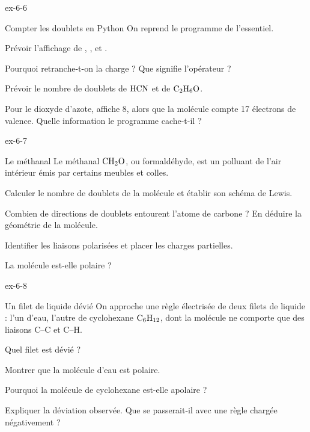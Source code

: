 \begin{blocLivre}{ex-6-6}
\begin{exercice}[2]{Compter les doublets en Python}
On reprend le programme de l'essentiel.
\begin{questions}
\item {}Prévoir l'affichage de , ,
 et .
\item Pourquoi retranche-t-on la charge ? Que signifie l'opérateur \code{//} ?
\item Prévoir le nombre de doublets de $\ce{HCN}$ et de $\ce{C2H6O}$.
\item Pour le dioxyde d'azote,  affiche 8, alors que la molécule compte 17 électrons de valence.
Quelle information le programme cache-t-il ?
\end{questions}
\end{exercice}
\end{blocLivre}
\begin{blocLivre}{ex-6-7}
\begin{exercice}[2]{Le méthanal}
Le méthanal $\ce{CH2O}$, ou formaldéhyde, est un polluant de l'air intérieur émis par certains meubles et colles.
\begin{questions}
\item Calculer le nombre de doublets de la molécule et établir son schéma de Lewis.
\item Combien de directions de doublets entourent l'atome de carbone ? En déduire la géométrie de la molécule.
\item Identifier les liaisons polarisées et placer les charges partielles.
\item La molécule est-elle polaire ?
\end{questions}
\end{exercice}
\end{blocLivre}
\begin{blocLivre}{ex-6-8}
\begin{exercice}[2]{Un filet de liquide dévié}
On approche une règle électrisée de deux filets de liquide : l'un d'eau, l'autre de cyclohexane $\ce{C6H12}$, dont la
molécule ne comporte que des liaisons C--C et C--H.
\begin{questions}
\item Quel filet est dévié ?
\item Montrer que la molécule d'eau est polaire.
\item Pourquoi la molécule de cyclohexane est-elle apolaire ?
\item Expliquer la déviation observée. Que se passerait-il avec une règle chargée négativement ?
\end{questions}
\end{exercice}
\end{blocLivre}
